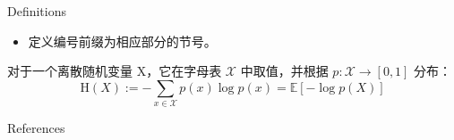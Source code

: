 \documentclass[
    11pt,
    notheorems,
    hyperref={pdfauthor=whatever}
]{beamer}
\begin{document}
\begin{frame}{}{Definitions}
    \begin{itemize}
        \item 定义编号前缀为相应部分的节号。
    \end{itemize}
    \begin{definition}[示例定义]
        对于一个离散随机变量 X，它在字母表 \(\mathcal{X}\) 中取值，并根据 \(p:{\mathcal {X}}\to [0,1]\) 分布：
        \begin{equation}
            \mathrm {H} (X):=-\sum _{x\in {\mathcal {X}}}p(x)\log p(x)=\mathbb {E} [-\log p(X)]
        \end{equation}
    \end{definition}
\end{frame}

\begin{frame}[allowframebreaks]{References}
    \printbibliography
\end{frame}

\thankspage
\end{document}
